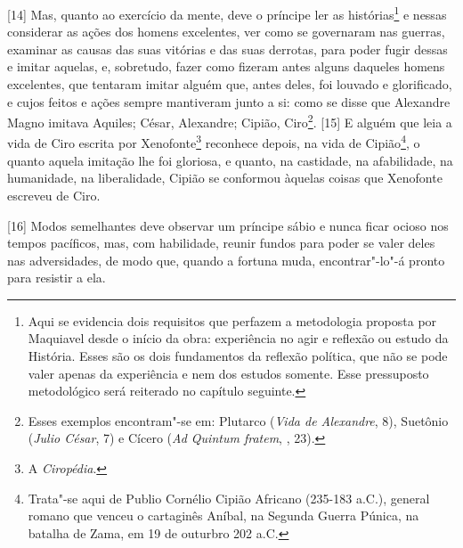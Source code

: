 {[}14{]} Mas, quanto ao exercício da mente, deve o príncipe ler as
histórias\footnote{Aqui se evidencia dois requisitos que perfazem a
  metodologia proposta por Maquiavel desde o início da obra: experiência
  no agir e reflexão ou estudo da História. Esses são os dois
  fundamentos da reflexão política, que não se pode valer apenas da
  experiência e nem dos estudos somente. Esse pressuposto metodológico
  será reiterado no capítulo seguinte.} e nessas considerar as ações dos
homens excelentes, ver como se governaram nas guerras, examinar as
causas das suas vitórias e das suas derrotas, para poder fugir dessas e
imitar aquelas, e, sobretudo, fazer como fizeram antes alguns daqueles
homens excelentes, que tentaram imitar alguém que, antes deles, foi
louvado e glorificado, e cujos feitos e ações sempre mantiveram junto a
si: como se disse que Alexandre Magno imitava Aquiles; César, Alexandre;
Cipião, Ciro\footnote{Esses exemplos encontram"-se em: Plutarco
  (\emph{Vida de Alexandre}, 8), Suetônio (\emph{Julio César}, 7) e
  Cícero (\emph{Ad Quintum fratem}, , 23).}. {[}15{]} E alguém que leia
a vida de Ciro escrita por Xenofonte\footnote{A \emph{Ciropédia}.}
reconhece depois, na vida de Cipião\footnote{Trata"-se aqui de Publio
  Cornélio Cipião Africano (235-183 a.C.), general romano que venceu o
  cartaginês Aníbal, na Segunda Guerra Púnica, na batalha de Zama, em 19
  de outurbro 202 a.C.}, o quanto aquela imitação lhe foi gloriosa, e
quanto, na castidade, na afabilidade, na humanidade, na liberalidade,
Cipião se conformou àquelas coisas que Xenofonte escreveu de Ciro.

{[}16{]} Modos semelhantes deve observar um príncipe sábio e nunca ficar
ocioso nos tempos pacíficos, mas, com habilidade, reunir fundos para
poder se valer deles nas adversidades, de modo que, quando a fortuna
muda, encontrar"-lo"-á pronto para resistir a ela.


